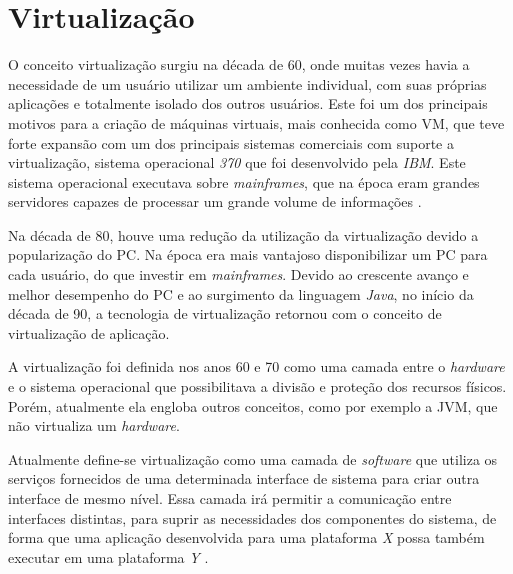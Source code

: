 \chapter{Virtualização}
\label{cap:virtualizacao}

O conceito virtualização surgiu na década de 60, onde muitas vezes havia a necessidade de um usuário utilizar um ambiente individual, 
com suas próprias aplicações e totalmente isolado dos outros usuários. Este foi um dos principais motivos para a criação de máquinas 
virtuais, mais conhecida como \ac{VM}, que teve forte expansão com um dos principais sistemas comerciais com suporte a virtualização, 
sistema operacional \textit{370} que foi desenvolvido pela \textit{IBM}. Este sistema operacional executava sobre \textit{mainframes}, 
que na época eram grandes servidores capazes de processar um grande volume de informações \cite{laureano2008}. 

Na década de 80, houve uma redução da utilização da virtualização devido a popularização do \ac{PC}. Na época era mais vantajoso disponibilizar 
um \ac{PC} para cada usuário, do que investir em \textit{mainframes}. Devido ao crescente avanço e melhor desempenho do \ac{PC} e
ao surgimento da linguagem \textit{Java}, no início da década de 90, a tecnologia de virtualização retornou com o conceito de virtualização
de aplicação.

A virtualização foi definida nos anos 60 e 70 como uma camada entre o \textit{hardware} e o sistema operacional que possibilitava a 
divisão e proteção dos recursos físicos. Porém, atualmente ela engloba outros conceitos, como por exemplo a \ac{JVM}, que não virtualiza
um \textit{hardware}. 

Atualmente define-se virtualização como uma camada de \textit{software} que utiliza os serviços fornecidos de uma determinada interface de 
sistema para criar outra interface de mesmo nível. Essa camada irá permitir a comunicação entre interfaces distintas, para suprir as 
necessidades dos componentes do sistema, de forma que uma aplicação desenvolvida para uma plataforma \textit{X} possa também executar 
em uma plataforma \textit{Y} \cite{laureano2008}.

